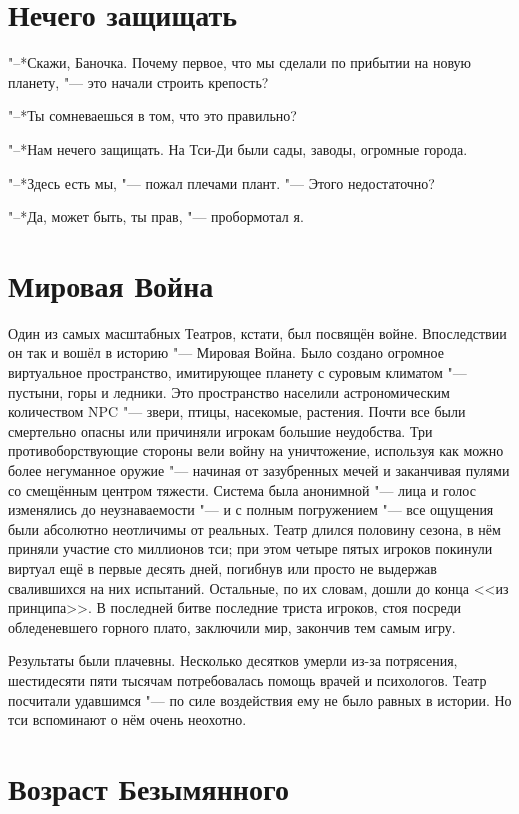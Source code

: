 \section{Нечего защищать}

"--*Скажи, Баночка.
Почему первое, что мы сделали по прибытии на новую планету, "--- это начали строить крепость?

"--*Ты сомневаешься в том, что это правильно?

"--*Нам нечего защищать.
На Тси-Ди были сады, заводы, огромные города.

"--*Здесь есть мы, "--- пожал плечами плант.
"--- Этого недостаточно?

"--*Да, может быть, ты прав, "--- пробормотал я.

\section{Мировая Война}

Один из самых масштабных Театров, кстати, был посвящён войне.
Впоследствии он так и вошёл в историю "--- Мировая Война.
Было создано огромное виртуальное пространство, имитирующее планету с суровым климатом "--- пустыни, горы и ледники.
Это пространство населили астрономическим количеством NPC "--- звери, птицы, насекомые, растения.
Почти все были смертельно опасны или причиняли игрокам большие неудобства.
Три противоборствующие стороны вели войну на уничтожение, используя как можно более негуманное оружие "--- начиная от зазубренных мечей и заканчивая пулями со смещённым центром тяжести.
Система была анонимной "--- лица и голос изменялись до неузнаваемости "--- и с полным погружением "--- все ощущения были абсолютно неотличимы от реальных.
Театр длился половину сезона, в нём приняли участие сто миллионов тси;
при этом четыре пятых игроков покинули виртуал ещё в первые десять дней, погибнув или просто не выдержав свалившихся на них испытаний.
Остальные, по их словам, дошли до конца <<из принципа>>.
В последней битве последние триста игроков, стоя посреди обледеневшего горного плато, заключили мир, закончив тем самым игру.

Результаты были плачевны.
Несколько десятков умерли из-за потрясения, шестидесяти пяти тысячам потребовалась помощь врачей и психологов.
Театр посчитали удавшимся "--- по силе воздействия ему не было равных в истории.
Но тси вспоминают о нём очень неохотно.

\section{Возраст Безымянного}

